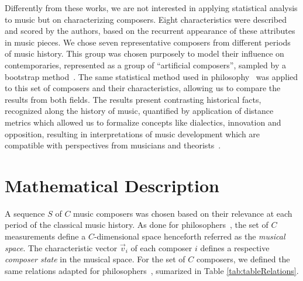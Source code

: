 \documentclass[
 aip,
 jmp,
 amsmath,amssymb,
 reprint,
]{revtex4-1}
\begin{document}
Differently from these works, we are not interested in applying
statistical analysis to music but on characterizing composers.
Eight characteristics were described and scored by the authors, based
on the recurrent appearance of these attributes in music pieces.
We chose seven representative composers from different periods of
music history. 
This group was chosen purposely to model their
influence on contemporaries, represented as a group of
``artificial composers'', sampled by a bootstrap
method~\cite{Varian}.
The same statistical method used in
philosophy~\cite{Fabbri} was applied to this set of composers and their
characteristics, allowing us to compare the results from both fields.
The
results present contrasting historical facts, recognized along
the history of music, quantified by application of
distance metrics which allowed us to formalize
concepts like dialectics, innovation and opposition, resulting in
interpretations of music development which are
compatible with perspectives from musicians and
theorists~\cite{Webern, Lovelock}.

\section{Mathematical Description}

A sequence $S$ of $C$ music composers was chosen based on their
relevance at each period of the classical music history.
As done for philosophers~\cite{Fabbri}, the set of $C$ measurements
define a $C$-dimensional space henceforth referred as the \emph{musical space}.  
The characteristic vector $\vec{v}_i$ of each composer $i$ defines a respective
\emph{composer state} in the musical space. For the set of
$C$ composers, we defined the same relations adapted for philosophers~\cite{Fabbri}, 
sumarized in Table \ref{tab:tableRelations}. 
\end{document}
